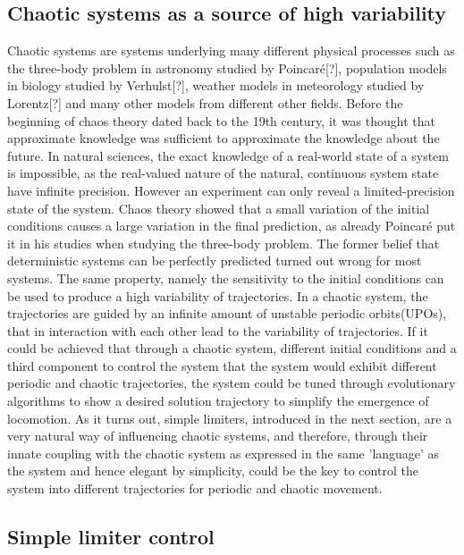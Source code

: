 \documentclass[main]{subfiles}
\begin{document}

\subsection{Chaotic systems as a source of high variability}

Chaotic systems are systems underlying many different physical processes such as the three-body problem in astronomy studied by Poincaré[?], population models in biology studied by Verhulst[?], weather models in meteorology studied by Lorentz[?] and many other models from different other fields. Before the beginning of chaos theory dated back to the 19th century, it was thought that approximate knowledge was sufficient to approximate the knowledge about the future. In natural sciences, the exact knowledge of a real-world state of a system is impossible, as the real-valued nature of the natural, continuous system state have infinite precision. However an experiment can only reveal a limited-precision state of the system. Chaos theory showed that a small variation of the initial conditions causes a large variation in the final prediction, as already Poincaré put it in his studies when studying the three-body problem. The former belief that deterministic systems can be perfectly predicted turned out wrong for most systems. The same property, namely the sensitivity to the initial conditions can be used to produce a high variability of trajectories. In a chaotic system, the trajectories are guided by an infinite amount of unstable periodic orbits(UPOs), that in interaction with each other lead to the variability of trajectories. If it could be achieved that through a chaotic system, different initial conditions and a third component to control the system that the system would exhibit different periodic and chaotic trajectories, the system could be tuned through evolutionary algorithms to show a desired solution trajectory to simplify the emergence of locomotion. As it turns out, simple limiters, introduced in the next section, are a very natural way of influencing chaotic systems, and therefore, through their innate coupling with the chaotic system as expressed in the same 'language' as the system and hence elegant by simplicity, could be the key to control the system into different trajectories for periodic and chaotic movement.

\subsection{Simple limiter control}

\lipsum[1]

\end{document}
